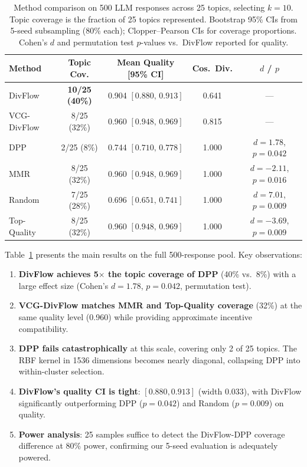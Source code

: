 \documentclass[10pt]{article}
\begin{document}
\begin{table}[t]
\centering
\caption{Method comparison on 500 LLM responses across 25 topics, selecting $k{=}10$.
Topic coverage is the fraction of 25 topics represented.
Bootstrap 95\% CIs from 5-seed subsampling (80\% each); Clopper--Pearson CIs for coverage proportions.
Cohen's $d$ and permutation test $p$-values vs.\ DivFlow reported for quality.}
\label{tab:main}
\small
\begin{tabular}{lcccc}
\toprule
\textbf{Method} & \textbf{Topic Cov.} & \textbf{Mean Quality [95\% CI]} & \textbf{Cos.\ Div.} & \textbf{$d$ / $p$} \\
\midrule
DivFlow      & \textbf{10/25 (40\%)} & 0.904\; $[0.880,\, 0.913]$ & 0.641 & --- \\
VCG-DivFlow  & 8/25 (32\%) & 0.960\; $[0.948,\, 0.969]$ & 0.815 & --- \\
DPP          & 2/25 (8\%)  & 0.744\; $[0.710,\, 0.778]$ & 1.000 & $d{=}1.78$, $p{=}0.042$ \\
MMR          & 8/25 (32\%) & 0.960\; $[0.948,\, 0.969]$ & 1.000 & $d{=}{-}2.11$, $p{=}0.016$ \\
Random       & 7/25 (28\%) & 0.696\; $[0.651,\, 0.741]$ & 1.000 & $d{=}7.01$, $p{=}0.009$ \\
Top-Quality  & 8/25 (32\%) & 0.960\; $[0.948,\, 0.969]$ & 1.000 & $d{=}{-}3.69$, $p{=}0.009$ \\
\bottomrule
\end{tabular}
\end{table}

Table~\ref{tab:main} presents the main results on the full 500-response pool.
Key observations:

\begin{enumerate}[leftmargin=*,itemsep=2pt]
  \item \textbf{DivFlow achieves 5$\times$ the topic coverage of DPP} (40\% vs.\ 8\%) with a large effect size (Cohen's $d = 1.78$, $p = 0.042$, permutation test).
  \item \textbf{VCG-DivFlow matches MMR and Top-Quality coverage} (32\%) at the same quality level (0.960) while providing approximate incentive compatibility.
  \item \textbf{DPP fails catastrophically} at this scale, covering only 2 of 25 topics. The RBF kernel in 1536 dimensions becomes nearly diagonal, collapsing DPP into within-cluster selection.
  \item \textbf{DivFlow's quality CI is tight}: $[0.880, 0.913]$ (width 0.033), with DivFlow significantly outperforming DPP ($p = 0.042$) and Random ($p = 0.009$) on quality.
  \item \textbf{Power analysis}: 25 samples suffice to detect the DivFlow-DPP coverage difference at 80\% power, confirming our 5-seed evaluation is adequately powered.
\end{enumerate}
\end{document}
